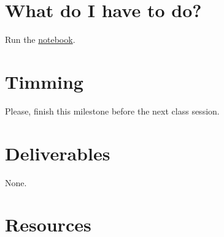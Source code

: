 \section{What do I have to do?}
Run the \href{https://github.com/Sistemas-s-Multimedia.github.io/blob/master/contents/2D_DCT/RD_performance.ipynb}{notebook}.

\section{Timming}

Please, finish this milestone before the next class session.

\section{Deliverables}

None.

\section{Resources}

\renewcommand{\addcontentsline}[3]{}%

